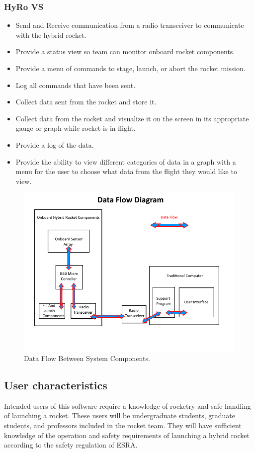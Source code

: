 \documentclass[10pt,draftclsnofoot,onecolumn,compsoc]{IEEEtran}
\begin{document}
\subsubsection{HyRo VS}
\begin{itemize}
\item Send and Receive communication from a radio transceiver to communicate with the hybrid rocket.
\item Provide a status view so team can monitor onboard rocket components.
\item Provide a menu of commands to stage, launch, or abort the rocket mission.
\item Log all commands that have been sent.
\item Collect data sent from the rocket and store it.
\item Collect data from the rocket and visualize it on the screen in its appropriate gauge or graph while rocket is in flight.
\item Provide a log of the data.
\item Provide the ability to view different categories of data in a graph with a menu for the user to choose what data from the flight they would like to view.\end{itemize}

\begin{figure}[!ht]
  \caption{Data Flow Between System Components.}
  \centering
	\includegraphics[scale=.85]{RocketBlockDiagram}
\end{figure}
\FloatBarrier
\subsection{ User characteristics}
Intended users of this software require a knowledge of rocketry and safe handling of launching a rocket. These users will be undergraduate students, graduate students, and professors included in the rocket team. They will have sufficient knowledge of the operation and safety requirements of launching a hybrid rocket according to the safety regulation of ESRA.
\end{document}
